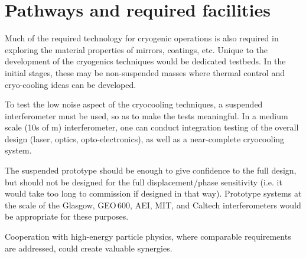 %


\section{Pathways and required facilities}
Much of the required technology for cryogenic operations is also required
in exploring the material properties of mirrors, coatings, etc.
Unique to the development of the cryogenics techniques would be dedicated
testbeds. In the initial stages, these may be non-suspended masses where
thermal control and cryo-cooling ideas can be developed.

To test the low noise aspect of the cryocooling techniques, a suspended
interferometer must be used, so as to make the tests meaningful. In a
medium scale (10s of m) interferometer, one can conduct integration testing
of the overall design (laser, optics, opto-electronics), as well as a
near-complete cryocooling system.

The suspended prototype should be enough to give confidence to the full design,
but should not be designed for the full displacement/phase sensitivity
(i.e. it would take too long to commission if designed in that way).
Prototype systems at the scale of the Glasgow, GEO\,600, AEI, MIT, and Caltech interferometers
would be appropriate for these purposes. 

Cooperation with high-energy particle physics, where comparable requirements are addressed, could create valuable synergies.


